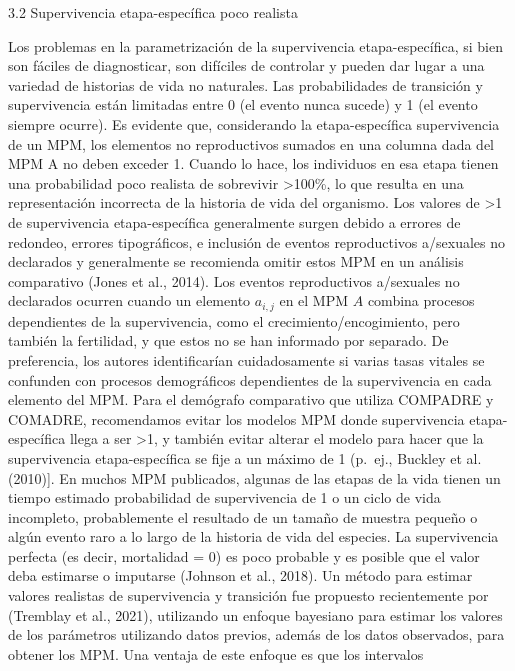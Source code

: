 \documentclass[
  12pt,
  letterpaper,
]{book}
\begin{document}
3.2 \textbar{} Supervivencia etapa-específica poco realista

Los problemas en la parametrización de la supervivencia
etapa-específica, si bien son fáciles de diagnosticar, son difíciles de
controlar y pueden dar lugar a una variedad de historias de vida no
naturales. Las probabilidades de transición y supervivencia están
limitadas entre 0 (el evento nunca sucede) y 1 (el evento siempre
ocurre). Es evidente que, considerando la etapa-específica supervivencia
de un MPM, los elementos no reproductivos sumados en una columna dada
del MPM A no deben exceder 1. Cuando lo hace, los individuos en esa
etapa tienen una probabilidad poco realista de sobrevivir
\textgreater100\%, lo que resulta en una representación incorrecta de la
historia de vida del organismo. Los valores de \textgreater1 de
supervivencia etapa-específica generalmente surgen debido a errores de
redondeo, errores tipográficos, e inclusión de eventos reproductivos
a/sexuales no declarados y generalmente se recomienda omitir estos MPM
en un análisis comparativo (Jones et al., 2014). Los eventos
reproductivos a/sexuales no declarados ocurren cuando un elemento
\(a_{i,j}\) en el MPM \(A\) combina procesos dependientes de la
supervivencia, como el crecimiento/encogimiento, pero también la
fertilidad, y que estos no se han informado por separado. De
preferencia, los autores identificarían cuidadosamente si varias tasas
vitales se confunden con procesos demográficos dependientes de la
supervivencia en cada elemento del MPM. Para el demógrafo comparativo
que utiliza COMPADRE y COMADRE, recomendamos evitar los modelos MPM
donde supervivencia etapa-específica llega a ser \textgreater1, y
también evitar alterar el modelo para hacer que la supervivencia
etapa-específica se fije a un máximo de 1 (p.~ej., Buckley et al.
(2010){]}. En muchos MPM publicados, algunas de las etapas de la vida
tienen un tiempo estimado probabilidad de supervivencia de 1 o un ciclo
de vida incompleto, probablemente el resultado de un tamaño de muestra
pequeño o algún evento raro a lo largo de la historia de vida del
especies. La supervivencia perfecta (es decir, mortalidad = 0) es poco
probable y es posible que el valor deba estimarse o imputarse (Johnson
et al., 2018). Un método para estimar valores realistas de supervivencia
y transición fue propuesto recientemente por (Tremblay et al., 2021),
utilizando un enfoque bayesiano para estimar los valores de los
parámetros utilizando datos previos, además de los datos observados,
para obtener los MPM. Una ventaja de este enfoque es que los intervalos
\end{document}

